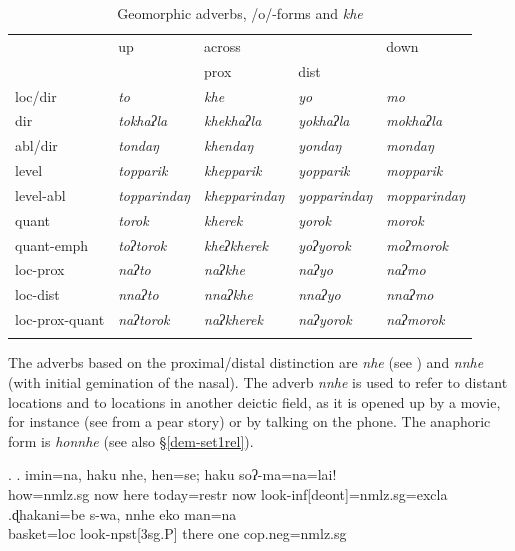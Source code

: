  \begin{table}[htp]
\begin{centering}
\begin{tabular}{lllll}
\lsptoprule
									&{\sc up}		&\multicolumn{2}{l}{{\sc across}}&{\sc down}\\
											&				&{\sc prox}&{\sc dist}&\\
\midrule 	  
			{\sc loc/dir}	&\emph{to}&\emph{khe}&\emph{yo}&\emph{mo}\\
			{\sc dir} 				&\emph{tokhaʔla}&\emph{khekhaʔla}&\emph{yokhaʔla}&\emph{mokhaʔla}\\
			{\sc abl/dir}											&\emph{tondaŋ}&\emph{khendaŋ}&\emph{yondaŋ}&\emph{mondaŋ}\\
			{\sc level}											&\emph{topparik}&\emph{khepparik}&\emph{yopparik}&\emph{mopparik}\\
			{\sc level-abl}									&\emph{topparindaŋ}&\emph{khepparindaŋ}&\emph{yopparindaŋ}&\emph{mopparindaŋ}\\
			{\sc quant} 					&\emph{torok}&\emph{kherek}&\emph{yorok}&\emph{morok}\\
			{\sc quant-emph}								&\emph{toʔtorok}&\emph{kheʔkherek}&\emph{yoʔyorok}&\emph{moʔmorok}\\
			{\sc loc-prox}									&\emph{naʔto}&\emph{naʔkhe}&\emph{naʔyo}&\emph{naʔmo}\\
			{\sc loc-dist}										&\emph{nnaʔto}&\emph{nnaʔkhe}&\emph{nnaʔyo}&\emph{nnaʔmo}\\
			{\sc loc-prox-quant}					&\emph{naʔtorok}&\emph{naʔkherek}&\emph{naʔyorok}&\emph{naʔmorok}\\
\lspbottomrule
\end{tabular} 
\caption{Geomorphic adverbs, /o/-forms and \emph{khe}}\label{deic-all2}
\end{centering}
\end{table}


The adverbs based on the proximal/distal distinction are \emph{nhe}  (see \Next[a]) and \emph{nnhe}  (with initial gemination of the nasal). The adverb \emph{nnhe} is used to refer to distant locations and to locations in another deictic field, as it is opened up by a movie, for instance  (see \Next[b] from a pear story) or by talking on the phone. The anaphoric form is \emph{honnhe}  (see also §\ref{dem-set1rel}). 

\ex. \ag. imin=na,       haku nhe, hen=se;         haku soʔ-ma=na=lai!\\
how{\sc =nmlz.sg}  now here today{\sc =restr} now look{\sc -inf[deont]=nmlz.sg=excla}\\
  
\bg.ɖhakani=be    s-wa,         nnhe  eko man=na \\
basket{\sc =loc} look{\sc -npst[3sg.P]} there one {\sc cop.neg=nmlz.sg}\\
 


